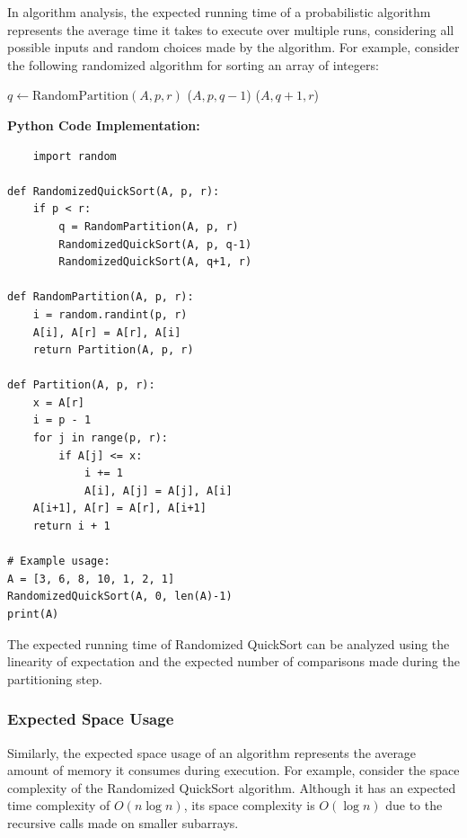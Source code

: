 \documentclass[12pt]{book} %
\begin{document}
In algorithm analysis, the expected running time of a probabilistic algorithm represents the average time it takes to execute over multiple runs, considering all possible inputs and random choices made by the algorithm. For example, consider the following randomized algorithm for sorting an array of integers:
\FloatBarrier
\begin{algorithm}[H]
\caption{Randomized QuickSort}
\begin{algorithmic}[1]
        \State $q \gets \text{RandomPartition}(A, p, r)$
        \State {}($A, p, q-1$)
        \State {}($A, q+1, r$)
    \EndIf
\EndFunction
\end{algorithmic}
\end{algorithm}
\FloatBarrier
\textbf{Python Code Implementation:}
\FloatBarrier
\begin{lstlisting}
    import random

def RandomizedQuickSort(A, p, r):
    if p < r:
        q = RandomPartition(A, p, r)
        RandomizedQuickSort(A, p, q-1)
        RandomizedQuickSort(A, q+1, r)

def RandomPartition(A, p, r):
    i = random.randint(p, r)
    A[i], A[r] = A[r], A[i]
    return Partition(A, p, r)

def Partition(A, p, r):
    x = A[r]
    i = p - 1
    for j in range(p, r):
        if A[j] <= x:
            i += 1
            A[i], A[j] = A[j], A[i]
    A[i+1], A[r] = A[r], A[i+1]
    return i + 1

# Example usage:
A = [3, 6, 8, 10, 1, 2, 1]
RandomizedQuickSort(A, 0, len(A)-1)
print(A)
\end{lstlisting}
\FloatBarrier
The expected running time of Randomized QuickSort can be analyzed using the linearity of expectation and the expected number of comparisons made during the partitioning step.

\subsubsection{Expected Space Usage}

Similarly, the expected space usage of an algorithm represents the average amount of memory it consumes during execution. For example, consider the space complexity of the Randomized QuickSort algorithm. Although it has an expected time complexity of \(O(n \log n)\), its space complexity is \(O(\log n)\) due to the recursive calls made on smaller subarrays.
\end{document}
